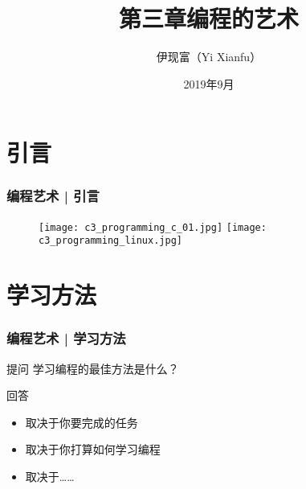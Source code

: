 


\title[编程的艺术]{第三章\quad 编程的艺术}
\author[Yixf]{伊现富（Yi Xianfu）}
\date{2019年9月}



\section{引言}
\begin{frame}
  \frametitle{编程艺术 | 引言}
  \begin{figure}
    \centering
    \texttt{[image: c3\_programming\_c\_01.jpg]}
    \quad
    \texttt{[image: c3\_programming\_linux.jpg]}
  \end{figure}
\end{frame}

\section{学习方法}
\begin{frame}
  \frametitle{编程艺术 | 学习方法}
  \begin{block}{提问}
 学习编程的最佳方法是什么？ 
  \end{block}
  \pause
  \begin{block}{回答}
    \begin{itemize}
      \item 取决于你要完成的任务
      \item 取决于你打算如何学习编程
      \item 取决于……
    \end{itemize}
  \end{block}
\end{frame}

